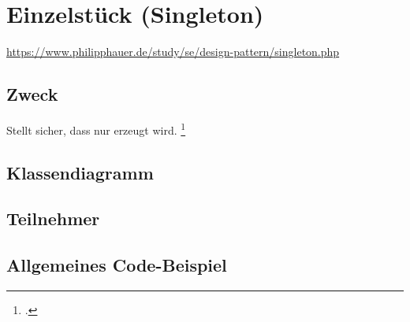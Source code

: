 \documentclass{lehramt-informatik-haupt}
\begin{document}

\chapter{Einzelstück (Singleton)}

\begin{liQuellen}
\item \cite{wiki:singleton}
\item \url{https://www.philipphauer.de/study/se/design-pattern/singleton.php}
\item \cite[Seite 109-115]{gof}
\item \cite[Kapitel 8.3.1, Seite 247-249]{schatten}
\item \cite[Kapitel 3.4 Seite 38-43]{eilebrecht}
\item \cite[Kapitel 1, Seite 1-17]{siebler}
\end{liQuellen}

\section{Zweck}

Stellt sicher, dass nur  erzeugt
wird.
\footcite[Seite 38]{eilebrecht}

%

\section{Klassendiagramm}

\liEntwurfsEinzelstueckUml

%

\section{Teilnehmer}

\liEntwurfsEinzelstueckAkteure

%

\section{Allgemeines Code-Beispiel}

\liEntwurfsEinzelstueckCode

\literatur
\end{document}

